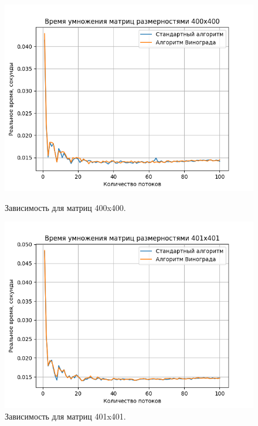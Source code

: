 \documentclass[a4paper,12pt]{article}
\begin{document}
\begin{figure}[H]
\begin{center}
\begin{minipage}[H]{0.48\linewidth}
\includegraphics[width=1\linewidth]{400x400.png}
\caption{Зависимость для матриц 400x400.}
\label{ris:experimoriginal}
\end{minipage}
\hfill
\begin{minipage}[H]{0.48\linewidth}
\includegraphics[width=1\linewidth]{401x401.png}
\caption{Зависимость для матриц 401x401.}
\label{ris:experimcoded}
\end{minipage}
\end{center}
\end{figure}
\end{document}
